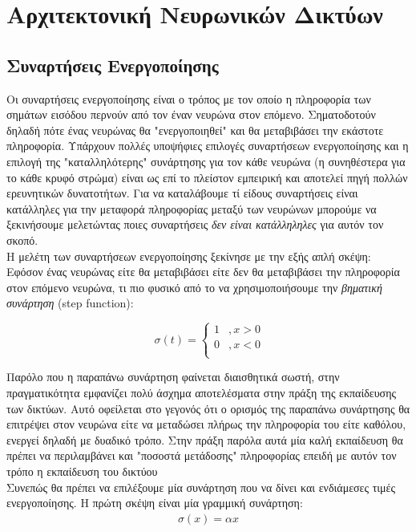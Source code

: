 \documentclass[11pt]{article} %
\begin{document}
\section{Αρχιτεκτονική Νευρωνικών Δικτύων}

\subsection{Συναρτήσεις Ενεργοποίησης}

Οι συναρτήσεις ενεργοποίησης είναι ο τρόπος με τον οποίο η πληροφορία των σημάτων εισόδου περνούν από τον έναν νευρώνα στον επόμενο. Σηματοδοτούν δηλαδή πότε ένας νευρώνας θα "ενεργοποιηθεί" και θα μεταβιβάσει την εκάστοτε πληροφορία. Υπάρχουν πολλές υποψήφιες επιλογές συναρτήσεων ενεργοποίησης και η επιλογή της "καταλληλότερης" συνάρτησης για τον κάθε νευρώνα (η συνηθέστερα για το κάθε κρυφό στρώμα) είναι ως επί το πλείστον εμπειρική και αποτελεί πηγή πολλών ερευνητικών δυνατοτήτων. Για να καταλάβουμε τί είδους συναρτήσεις είναι κατάλληλες για την μεταφορά πληροφορίας μεταξύ των νευρώνων μπορούμε να ξεκινήσουμε μελετώντας ποιες συναρτήσεις \textit{δεν είναι κατάλληληλες} για αυτόν τον σκοπό.\\

Η μελέτη των συναρτήσεων ενεργοποίησης ξεκίνησε με την εξής απλή σκέψη: Εφόσον ένας νευρώνας είτε θα μεταβιβάσει είτε δεν θα μεταβιβάσει την πληροφορία στον επόμενο νευρώνα, τι πιο φυσικό από το να χρησιμοποιήσουμε την \textit{βηματική συνάρτηση} (step function): 

\[ 
\ \sigma(t) = \left\{
\begin{array}{ll}
      1 & , x > 0 \\
      0 & , x < 0 \\
\end{array} 
\right. 
\]

Παρόλο που η παραπάνω συνάρτηση φαίνεται διαισθητικά σωστή, στην πραγματικότητα εμφανίζει πολύ άσχημα αποτελέσματα στην πράξη της εκπαίδευσης των δικτύων. Αυτό οφείλεται στο γεγονός ότι ο ορισμός της παραπάνω συνάρτησης θα επιτρέψει στον νευρώνα είτε να μεταδώσει πλήρως την πληροφορία του είτε καθόλου, ενεργεί δηλαδή με δυαδικό τρόπο. Στην πράξη παρόλα αυτά μία καλή εκπαίδευση θα πρέπει να περιλαμβάνει και "ποσοστά μετάδοσης" πληροφορίας επειδή με αυτόν τον τρόπο η εκπαίδευση του δικτύου \\

Συνεπώς θα πρέπει να επιλέξουμε μία συνάρτηση που να δίνει και ενδιάμεσες τιμές ενεργοποίησης. Η πρώτη σκέψη είναι μία γραμμική συνάρτηση:
\begin{align*}
\sigma (x) = \alpha x
\end{align*}
\end{document}

